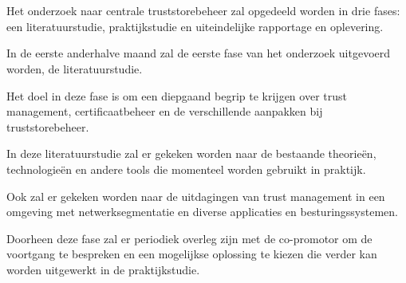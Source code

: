 
\chapter{}%
\label{ch:methodologie}


Het onderzoek naar centrale truststorebeheer zal opgedeeld worden in drie fases: een literatuurstudie, praktijkstudie en uiteindelijke rapportage en oplevering.

In de eerste anderhalve maand zal de eerste fase van het onderzoek uitgevoerd worden, de literatuurstudie.

Het doel in deze fase is om een diepgaand begrip te krijgen over trust management, certificaatbeheer en de verschillende aanpakken bij truststorebeheer.

In deze literatuurstudie zal er gekeken worden naar de bestaande theorieën, technologieën en andere tools die momenteel worden gebruikt in praktijk.

Ook zal er gekeken worden naar de uitdagingen van trust management in een omgeving met netwerksegmentatie en diverse applicaties en besturingssystemen.

Doorheen deze fase zal er periodiek overleg zijn met de co-promotor om de voortgang te bespreken en een mogelijkse oplossing te kiezen die verder kan worden uitgewerkt in de praktijkstudie.

